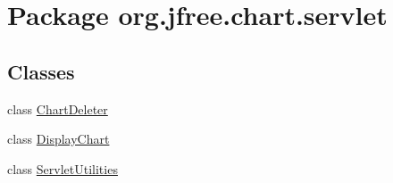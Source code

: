 \hypertarget{namespaceorg_1_1jfree_1_1chart_1_1servlet}{}\section{Package org.\+jfree.\+chart.\+servlet}
\label{namespaceorg_1_1jfree_1_1chart_1_1servlet}
\subsection*{Classes}
\begin{DoxyCompactItemize}
\item 
class \mbox{\hyperlink{classorg_1_1jfree_1_1chart_1_1servlet_1_1_chart_deleter}{Chart\+Deleter}}
\item 
class \mbox{\hyperlink{classorg_1_1jfree_1_1chart_1_1servlet_1_1_display_chart}{Display\+Chart}}
\item 
class \mbox{\hyperlink{classorg_1_1jfree_1_1chart_1_1servlet_1_1_servlet_utilities}{Servlet\+Utilities}}
\end{DoxyCompactItemize}
